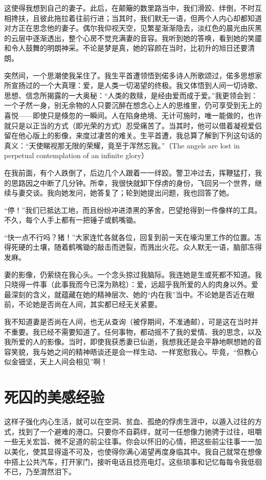 \documentclass[11pt,oneside]{book}
\begin{document}
\begin{common-format}
这使得我想到自己的妻子。此后，在颠簸的数里路当中，我们滑跤、绊倒，不时互相搀扶，且彼此拖拉着往前行进；当其时，我们默无一语，但两个人内心却都知道对方正在思念他的妻子。偶尔我仰视天空，见繁星渐渐隐去，淡红色的晨光由灰黑的云层中逐渐透出，整个心房不觉充满妻的音容。我听到她的答唤，看到她的笑靥和令人鼓舞的明朗神采。不论是梦是真，她的容颜在当时，比初升的旭日还要清朗。

突然间，一个思潮使我呆住了。我生平首遭领悟到偌多诗人所歌颂过，偌多思想家所宣扬过的一个大真理：爱，是人类一切渴望的终极。我又体悟到人间一切诗歌、思想、信念所揭露的一大奥秘：“人类的救赎，是经由爱而成于爱。”我更领会到：一个孑然一身，别无余物的人只要沉醉在想念心上人的思维里，仍可享受到无上的喜悦——即使只是倏忽的一瞬间。人在陷身绝境、无计可施时，唯一能做的，也许就只是以正当的方式（即光荣的方式）忍受痛苦了。当其时，他可以借着凝视爱侣留在他心版上的影像，来度过凄苦的难关。生平首遭，我总算了解到下列这句话的真义：“天使睇视那无限的荣耀，竟至于浑然忘我。”（The angels are lost in perpetual contemplation of an infinite glory）

在我前面，有个人跌倒了，后边几个人跟着一一绊跤。警卫冲过去，挥鞭猛打，我的思路因之中断了几分钟。所幸，我很快就卸下俘虏的身份，飞回另一个世界，继续与妻交谈。我向她发问，她答复了；轮到她提出问题，我也回答了她。

“停！”我们已抵达工地，而且纷纷冲进漆黑的茅舍，巴望抢得到一件像样的工具。不久，每个人手上都有一把锤子或鹤嘴锄。

“快一点不行吗？猪！”大家连忙各就各位，回复到前一天在壕沟里工作的位置。冻得死硬的土壤，随着鹤嘴锄的敲击而迸裂，而溅出火花。众人默无一语，脑部冻得发麻。

妻的影像，仍萦绕在我心头。一个念头掠过我脑际。我连她是生或死都不知道。我只晓得一件事（此事我而今已深为熟稔）：爱，远超乎我所爱的人的肉身以外。爱最深刻的含义，就蕴藏在她的精神层次、她的“内在我”当中。不论她是否近在眼前，不论她是否尚在人间，其实都已经无关紧要。

我不知道妻是否尚在人间，也无从查询（被俘期间，不准通邮），可是这在当时并不重要。我已经不需要知道了。任何事物，都动摇不了我的爱情、我的思念，以及我所爱的人的影像。当时，即使我获悉妻已仙逝，我想我还是会平静地瞑想她的音容笑貌，我与她之间的精神晤谈还是会一样生动、一样宽慰我心。毕竟，“但教心似金钿坚，天上人间会相见”啊！


\section{死囚的美感经验}
这样子强化内心生活，就可以在空洞、贫血、孤绝的俘虏生涯中，以遁入过往的方式，找到了一个避难的港口。只要你不自羁绊，就可一任想像力驰骋于过往，咀嚼一些无关宏旨、微不足道的前尘往事。你会以怀旧的心情，把这些前尘往事一一加以美化，使其显得遥不可及，也使得你满心渴望再度身临其中。我自己就常在想像中搭上公共汽车，打开家门，接听电话且捻亮电灯。这些琐事和记忆每每令我低徊不已，乃至潸然泪下。


\end{common-format}
\end{document}
